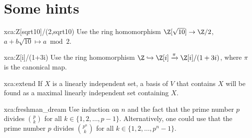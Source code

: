 \chapter*{Some hints}

\begin{sol}{xca:Z[sqrt10]/(2,sqrt10)}
	Use the ring homomorphism $\Z[\sqrt{10}]\to\Z/2$, $a+b\sqrt{10}\mapsto a\bmod 2$. 	
\end{sol}

\begin{sol}{xca:Z[i]/(1+3i)}
	Use the ring homomorphism $\Z\hookrightarrow\Z[i]\xrightarrow{\pi}\Z[i]/(1+3i)$, where
	$\pi$ is the canonical map. 	
\end{sol}

\begin{sol}{xca:extend}
    If $X$ is a linearly independent set, a basis 
    of $V$ that contains $X$ will be found as a maximal linearly independent set 
    containing $X$. 
\end{sol}

\begin{sol}{xca:freshman_dream}
    Use induction on $n$ and the fact that the prime number $p$ divides 
    $\binom{p}{k}$ for all $k\in\{1,2,\dots,p-1\}$. Alternatively, one could use
    that the prime number $p$ divides $\binom{p^n}{k}$ for all 
    $k\in\{1,2,\dots,p^n-1\}$. 
\end{sol}



